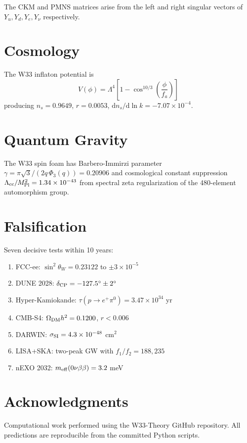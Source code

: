 \documentclass[12pt,letterpaper]{article}
\begin{document}
The CKM and PMNS matrices arise from the left and right singular
vectors of $Y_u, Y_d, Y_e, Y_\nu$ respectively.

\section{Cosmology}

The W33 inflaton potential is
\begin{equation}
V(\phi) = \Lambda^4\left[1 - \cos^{10/3}\!\left(\frac{\phi}{f_a}\right)\right]
\end{equation}
producing $n_s = 0.9649$, $r = 0.0053$, $\mathrm{d}n_s/\mathrm{d}\ln k = -7.07\times10^{-4}$.

\section{Quantum Gravity}

The W33 spin foam has Barbero-Immirzi parameter
$\gamma = \pi\sqrt{3}/(2q\,\Phi_3(q)) = 0.20906$ and cosmological
constant suppression $\Lambda_{\rm cc}/M_{\rm Pl}^2 = 1.34\times10^{-43}$
from spectral zeta regularization of the 480-element automorphism group.

\section{Falsification}

Seven decisive tests within 10 years:
\begin{enumerate}
\item FCC-ee: $\sin^2\theta_W = 0.23122$ to $\pm 3\times10^{-5}$
\item DUNE 2028: $\delta_{\rm CP} = -127.5^\circ \pm 2^\circ$
\item Hyper-Kamiokande: $\tau(p\to e^+\pi^0) = 3.47\times10^{34}$ yr
\item CMB-S4: $\Omega_{\rm DM}h^2 = 0.1200$, $r < 0.006$
\item DARWIN: $\sigma_{\rm SI} = 4.3\times10^{-48}$ cm$^2$
\item LISA+SKA: two-peak GW with $f_1/f_2 = 188{,}235$
\item nEXO 2032: $m_{\rm eff}(0\nu\beta\beta) = 3.2$ meV
\end{enumerate}

\section*{Acknowledgments}
Computational work performed using the W33-Theory GitHub repository.
All predictions are reproducible from the committed Python scripts.



\end{document}
